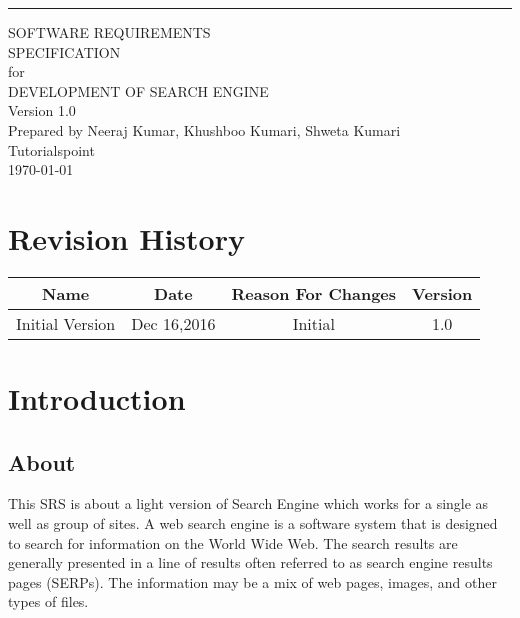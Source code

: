 \documentclass{scrreprt}
\date{}
\def\myversion{1.0 }
\begin{document}
\begin{flushright}
    \rule{16cm}{5pt}\vskip1cm
    \begin{bfseries}
        \Huge{SOFTWARE REQUIREMENTS\\ SPECIFICATION}\\
        \vspace{1.5cm}
        for\\
        \vspace{1.5cm}
        DEVELOPMENT OF SEARCH ENGINE\\
        \vspace{1.5cm}
        \LARGE{Version \myversion}\\
        \vspace{1.5cm}
        Prepared by Neeraj Kumar, Khushboo Kumari, Shweta Kumari\\
        \vspace{1.5cm}
        Tutorialspoint\\
        \vspace{1.5cm}
        \today\\
    \end{bfseries}
\end{flushright}

\tableofcontents


\chapter*{Revision History}

\begin{center}
    \begin{tabular}{|c|c|c|c|}
        \hline
	    Name & Date & Reason For Changes & Version\\
        \hline
	    Initial Version & Dec 16,2016 & Initial & 1.0\\
        \hline
    \end{tabular}
\end{center}

\chapter{Introduction}

\section{About}
This SRS is about a light version of Search Engine which works for a single as well as group of sites. A web search engine is a software system that is designed to search for information on the World Wide Web. The search results are generally presented in a line of results often referred to as search engine results pages (SERPs). The information may be a mix of web pages, images, and other types of files.
\end{document}

